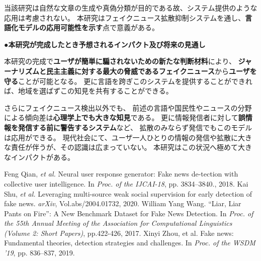 {	当該研究は⾃然な文章の⽣成や真偽分類が⽬的である故、システム提供のような応⽤は考慮されない。
	本研究はフェイクニュース拡散抑制システムを通し、\textbf{⾔語化モデルの応⽤可能性を⽰す}点で意義がある。

	\noindent
	●\textbf{本研究が完成したとき予想されるインパクト及び将来の見通し}
	
	本研究の完成で\textbf{ユーザが簡単に騙されないための新たな判断材料}により、
	\textbf{ジャーナリズムと民主主義に対する最大の脅威であるフェイクニュース}\cite{zhou2019wsdm}から\textbf{ユーザを守る}ことが可能となる。
	更に言語を跨ぎこのシステムを提供することができれば、地域を選ばずこの知見を共有することができる。
	
	さらにフェイクニュース検出以外でも、
	前述の言語や国民性やニュースの分野による傾向差は\textbf{心理学上でも大きな知見}である。
	更に情報発信者に対して\textbf{誤情報を発信する前に警告するシステム}など、
	拡散のみならず発信でもこのモデルは応用ができる。
	現代社会にて、ユーザ一人ひとりの情報の発信や拡散に大きな責任が伴うが、その認識は広まっていない。
	本研究はこの状況へ極めて⼤きなインパクトがある。

	

	{\footnotesize
		\begin{thebibliography}{99}
			\setcounter{enumiv}{7}
			\vspace*{-2mm}
			\setlength{\parskip}{0cm}
			\setlength{\itemsep}{0cm}
			\begin{spacing}{0.7}
				 Feng Qian, \textit{et al.} Neural user response generator: Fake news de-tection with collective user intelligence. In \textit{Proc. of the IJCAI-18}, pp. 3834–3840., 2018.
				 Kai Shu, \textit{et al.} Leveraging multi-source weak social supervision for early detection of fake news. \textit{arXiv}, Vol.abs/2004.01732, 2020.
				William Yang Wang. ``Liar, Liar Pants on Fire'': A New Benchmark Dataset for Fake News Detection. In \textit{Proc. of the 55th Annual Meeting of the Association for Computational Linguistics (Volume 2: Short Papers)}, pp.422-426, 2017.
				Xinyi Zhou, et al. Fake news: Fundamental theories, detection strategies and challenges. In \textit{Proc. of the WSDM '19}, pp. 836–837, 2019.
			\end{spacing}
		\end{thebibliography}
	}
}

